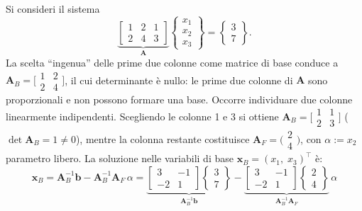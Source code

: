 \begin{esempio}
	Si consideri il sistema
	\begin{equation}
		\underbrace{\begin{bmatrix} 1 & 2 & 1 \\ 2 & 4 & 3 \end{bmatrix}}_{\bm{A}}
		\begin{Bmatrix} x_1 \\ x_2 \\ x_3 \end{Bmatrix}
		= \begin{Bmatrix} 3 \\ 7 \end{Bmatrix}.
	\end{equation}
	La scelta ``ingenua'' delle prime due colonne come matrice di base
	conduce a $\bm{A}_B=\bigl[\begin{smallmatrix}1 & 2\\ 2 &
		4\end{smallmatrix}\bigr]$, il cui determinante \`e nullo: le prime
	due colonne di $\bm{A}$ sono proporzionali e non possono formare una
	base. Occorre individuare due colonne linearmente indipendenti.
	Scegliendo le colonne 1 e 3 si ottiene
	$\bm{A}_B=\bigl[\begin{smallmatrix}1 & 1\\ 2 &
		3\end{smallmatrix}\bigr]$ ($\det\bm{A}_B=1\neq 0$), mentre la
	colonna restante costituisce
	$\bm{A}_F=\bigl(\begin{smallmatrix}2\\ 4\end{smallmatrix}\bigr)$,
	con $\alpha:=x_2$ parametro libero. La soluzione nelle variabili di
	base $\bm{x}_B=(x_1,\;x_3)^\top$ \`e:
	\begin{equation}
		\bm{x}_B = \bm{A}_B^{-1}\bm{b} - \bm{A}_B^{-1}\bm{A}_F\,\alpha
		= \underbrace{\begin{bmatrix} 3 & -1 \\ -2 & 1 \end{bmatrix}
			\begin{Bmatrix} 3 \\ 7 \end{Bmatrix}}_{\bm{A}_B^{-1}\bm{b}}
		- \underbrace{\begin{bmatrix} 3 & -1 \\ -2 & 1 \end{bmatrix}
			\begin{Bmatrix} 2 \\ 4 \end{Bmatrix}}_{\bm{A}_B^{-1}\bm{A}_F}\,\alpha

\end{equation}
\end{esempio}
